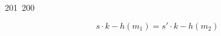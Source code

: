 201~200~\documentclass{article}
\begin{document}
	                                                                        	                                                                    	                                	                    	                    	                        	                        	                    	                                                                	                	                                                                    	                    							                                                                                                                                                                                                    		                                                                                                                        				    \[
	                                                                        	                                                                    	                                	                    	                    	                        	                        	                    	                                                                	                	                                                                    	                    							                                                                                                                                                                                                    		                                                                                                                        				    	s \cdot k - h(m_1) = s' \cdot k - h(m_2)
	                                                                        	                                                                    	                                	                    	                    	                        	                        	                    	                                                                	                	                                                                    	                    							                                                                                                                                                                                                    		                                                                                                                        				    	\]
\end{document}
